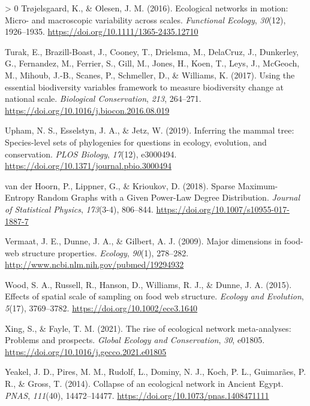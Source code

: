 \documentclass[10pt,oneside]{article}
\newlength{\cslhangindent}
\newenvironment{CSLReferences}[3] %
 {%
  \setlength{\parindent}{0pt}
  \ifodd #1 \everypar{\setlength{\hangindent}{\cslhangindent}}\ignorespaces\fi
  \ifnum #2 > 0
  \setlength{\parskip}{#2\baselineskip}
  \fi
 }%
 {}
\begin{document}
\begin{CSLReferences}{1}{0}
\leavevmode\hypertarget{ref-Trojelsgaard2016EcoNet}{}%
Trøjelsgaard, K., \& Olesen, J. M. (2016). Ecological networks in
motion: Micro- and macroscopic variability across scales.
\emph{Functional Ecology}, \emph{30}(12), 1926--1935.
\url{https://doi.org/10.1111/1365-2435.12710}

\leavevmode\hypertarget{ref-Turak2017UsiEss}{}%
Turak, E., Brazill-Boast, J., Cooney, T., Drielsma, M., DelaCruz, J.,
Dunkerley, G., Fernandez, M., Ferrier, S., Gill, M., Jones, H., Koen,
T., Leys, J., McGeoch, M., Mihoub, J.-B., Scanes, P., Schmeller, D., \&
Williams, K. (2017). Using the essential biodiversity variables
framework to measure biodiversity change at national scale.
\emph{Biological Conservation}, \emph{213}, 264--271.
\url{https://doi.org/10.1016/j.biocon.2016.08.019}

\leavevmode\hypertarget{ref-Upham2019InfMam}{}%
Upham, N. S., Esselstyn, J. A., \& Jetz, W. (2019). Inferring the mammal
tree: Species-level sets of phylogenies for questions in ecology,
evolution, and conservation. \emph{PLOS Biology}, \emph{17}(12),
e3000494. \url{https://doi.org/10.1371/journal.pbio.3000494}

\leavevmode\hypertarget{ref-vanderHoorn2018SpaMax}{}%
van der Hoorn, P., Lippner, G., \& Krioukov, D. (2018). Sparse
Maximum-Entropy Random Graphs with a Given Power-Law Degree
Distribution. \emph{Journal of Statistical Physics}, \emph{173}(3-4),
806--844. \url{https://doi.org/10.1007/s10955-017-1887-7}

\leavevmode\hypertarget{ref-Vermaat2009MajDim}{}%
Vermaat, J. E., Dunne, J. A., \& Gilbert, A. J. (2009). Major dimensions
in food-web structure properties. \emph{Ecology}, \emph{90}(1),
278--282. \url{http://www.ncbi.nlm.nih.gov/pubmed/19294932}

\leavevmode\hypertarget{ref-Wood2015EffSpa}{}%
Wood, S. A., Russell, R., Hanson, D., Williams, R. J., \& Dunne, J. A.
(2015). Effects of spatial scale of sampling on food web structure.
\emph{Ecology and Evolution}, \emph{5}(17), 3769--3782.
\url{https://doi.org/10.1002/ece3.1640}

\leavevmode\hypertarget{ref-Xing2021RisEco}{}%
Xing, S., \& Fayle, T. M. (2021). The rise of ecological network
meta-analyses: Problems and prospects. \emph{Global Ecology and
Conservation}, \emph{30}, e01805.
\url{https://doi.org/10.1016/j.gecco.2021.e01805}

\leavevmode\hypertarget{ref-Yeakel2014ColEco}{}%
Yeakel, J. D., Pires, M. M., Rudolf, L., Dominy, N. J., Koch, P. L.,
Guimarães, P. R., \& Gross, T. (2014). Collapse of an ecological network
in Ancient Egypt. \emph{PNAS}, \emph{111}(40), 14472--14477.
\url{https://doi.org/10.1073/pnas.1408471111}


\end{CSLReferences}
\end{document}
